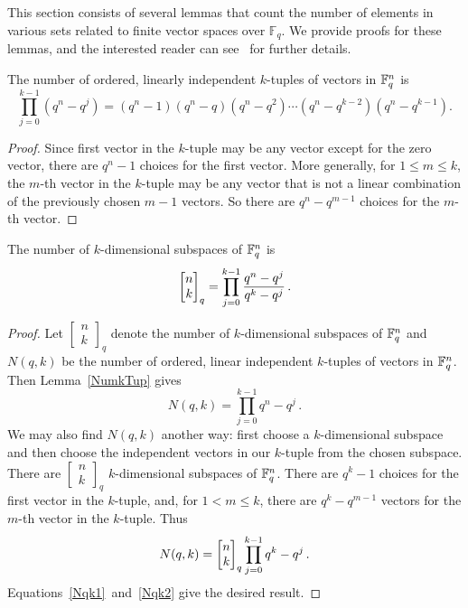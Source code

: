 This section consists of several lemmas that count the number of elements in
various sets related to finite vector spaces over $\mathbb{F}_q$.  We provide
proofs for these lemmas, and the interested reader can
see~\cite{stanley2011enumerative} for further details. 

\begin{lemma}\label{NumkTup}
  The number of ordered, linearly independent $k$-tuples of vectors in $\mathbb{F}_q^{n}$  is
\[
\prod_{j=0}^{k-1} \left(q^n - q^j\right) = 
(q^n-1)(q^n-q)(q^n-q^2)\cdots(q^n - q^{k-2})(q^n-q^{k-1}).
\]
\end{lemma}

\begin{proof}
Since first vector in the $k$-tuple may be any vector except for the zero
vector, there are $q^n-1$ choices for the first vector.  More generally, for $1
\leq m \leq k$, the
$m$-th vector in the $k$-tuple may be any vector that is not a linear
combination of the previously chosen $m-1$ vectors. So there are $q^n -
q^{m-1}$ choices for the $m$-th vector.
\end{proof}

\begin{lemma}\label{NumkSub}
  The number of $k$-dimensional subspaces of $\mathbb{F}_q^{n}$ is
\[
  \begin{bmatrix}{n}\\ {k}\end{bmatrix}_q = \prod_{j=0}^{k-1} \frac{q^n-q^j}{q^k-q^j} \, .
\]
\end{lemma}

\begin{proof}
  Let $\left[\begin{smallmatrix}n\\k\end{smallmatrix}\right]_q$ denote the number of $k$-dimensional subspaces of $\mathbb{F}_q^{n}$
  and $N(q,k)$ be the number of ordered, linear independent $k$-tuples of
  vectors in $\mathbb{F}_q^{n}$.  Then Lemma~\ref{NumkTup} gives
  \begin{equation}
    \label{Nqk1}
    N(q,k) = \prod_{j=0}^{k-1} q^n-q^j \, .
  \end{equation}
  We may also find $N(q,k)$ another way: first choose a $k$-dimensional
  subspace and then choose the independent vectors in our $k$-tuple from the
  chosen subspace.  There are
  $\left[\begin{smallmatrix}n\\k\end{smallmatrix}\right]_q$ $k$-dimensional
  subspaces of $\mathbb{F}_q^{n}$.  There are $q^k-1$ choices for the first vector in
  the $k$-tuple, and, for $1<m \leq k$, there are $q^k - q^{m-1}$ vectors for
  the $m$-th vector in the $k$-tuple.  Thus
  \begin{equation}\label{Nqk2}
    N(q,k) = \begin{bmatrix}{n}\\ {k}\end{bmatrix}_q\prod_{j=0}^{k-1} q^k - q^j \, .
  \end{equation}
  Equations~\eqref{Nqk1}~and~\eqref{Nqk2} give the desired result.
\end{proof}

